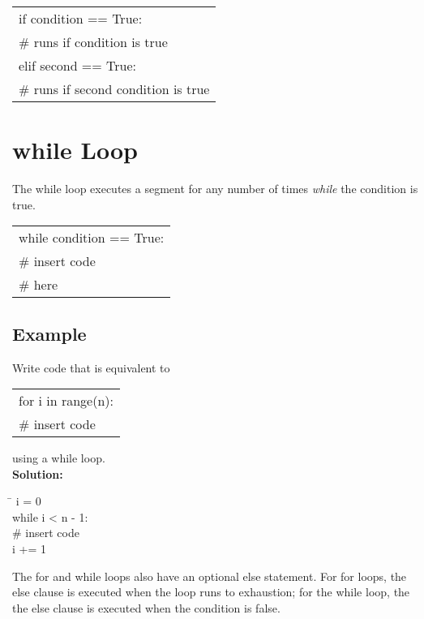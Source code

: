 \documentclass{article}
\newcommand{\icode}[1]{{\ttfamily #1}}
\newenvironment{code}{\begin{tcolorbox}\ttfamily}{\end{tcolorbox}}
\begin{document}
\begin{center} \ttfamily
	\begin{tabular}{|l}
		if condition == True:\\
		\hspace{2 em}\# runs if condition is true\\
		elif second == True:\\
		\hspace{2 em}\# runs if second condition is true
	\end{tabular}
\end{center}
\section{\icode{while} Loop}
The \icode{while} loop executes a segment for any number of times \textit{while} the condition is true. 

\begin{center} \ttfamily
	\begin{tabular}{|l}
		while condition == True:\\
		\hspace{2 em}\# insert code\\
		\hspace{2 em}\# here
	\end{tabular}
\end{center}


\subsection{Example}
\noindent Write code that is equivalent to 

\begin{center} \ttfamily
	\begin{tabular}{|l}
		for i in range(n):\\
		\hspace{2 em}\# insert code
	\end{tabular}
\end{center}
using a while loop.\\
\noindent\textbf{Solution:}
\begin{code}
	\begin{tabbing}
		\hspace{3.5 in}\=\hspace{3.25 in} \kill
		i = 0\\
		while i < n - 1:\\
		\hspace{2 em}\# insert code\\
		\hspace{2 em}i += 1
	\end{tabbing}
\end{code}
\vspace{.5 cm}
The \icode{for} and \icode{while} loops also have an optional \icode{else} statement. For \icode{for} loops, the \icode{else} clause is executed when the loop runs to exhaustion; for the \icode{while} loop, the the \icode{else} clause is executed when the condition is false.
\end{document}
